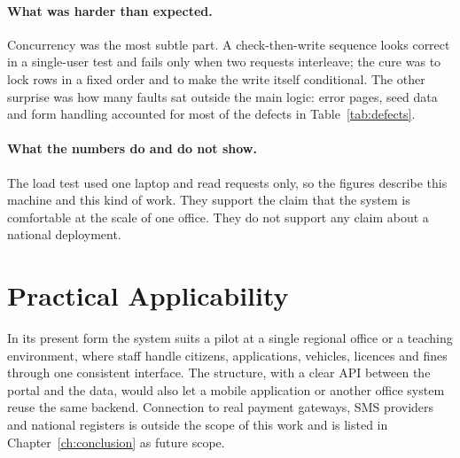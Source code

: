 \paragraph{What was harder than expected.} Concurrency was the most subtle part. A
check-then-write sequence looks correct in a single-user test and fails only when two
requests interleave; the cure was to lock rows in a fixed order and to make the write itself
conditional. The other surprise was how many faults sat outside the main logic: error pages,
seed data and form handling accounted for most of the defects in Table~\ref{tab:defects}.

\paragraph{What the numbers do and do not show.} The load test used one laptop and read
requests only, so the figures describe this machine and this kind of work. They support the
claim that the system is comfortable at the scale of one office. They do not support any
claim about a national deployment.

\section{Practical Applicability}
In its present form the system suits a pilot at a single regional office or a teaching
environment, where staff handle citizens, applications, vehicles, licences and fines through
one consistent interface. The structure, with a clear API between the portal and the
data, would also let a mobile application or another office system reuse the same backend.
Connection to real payment gateways, SMS providers and national registers is outside the
scope of this work and is listed in Chapter~\ref{ch:conclusion} as future scope.
